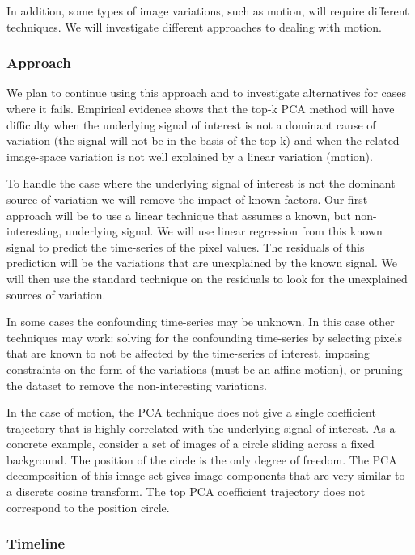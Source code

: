 In addition, some types of image variations, such as motion, will require
different techniques.  We will investigate different approaches to
dealing with motion. 

\subsubsection{Approach}


We plan to continue using this approach and to investigate
alternatives for cases where it fails.   Empirical evidence shows
that the top-k PCA method will have difficulty when the underlying
signal of interest is not a dominant cause of variation (the signal
will not be in the basis of the top-k) and when
the related image-space variation is not well explained by a linear
variation (\eg motion).

To handle the case where the underlying signal of interest is not the
dominant source of variation we will remove the impact of known
factors.  Our first approach will be to use a linear technique that
assumes a known, but non-interesting, underlying signal.  We will use
linear regression from this known signal to predict the time-series of
the pixel values.  The residuals of this prediction will be the
variations that are unexplained by the known signal.  We will then use
the standard technique on the residuals to look for the unexplained
sources of variation.

In some cases the confounding time-series may be unknown.  In this
case other techniques may work: solving for the confounding
time-series by selecting pixels that are known to not be affected by
the time-series of interest, imposing constraints on the form of the
variations (\eg must be an affine motion), or pruning the dataset to
remove the non-interesting variations.

In the case of motion, the PCA technique does not give a single
coefficient trajectory that is highly correlated with the underlying
signal of interest.  As a concrete example, consider a set of images
of a circle sliding across a fixed background.   The position of the
circle is the only degree of freedom.  The PCA decomposition of this
image set gives image components that are very similar to a discrete
cosine transform.  The top PCA coefficient trajectory does not
correspond to the position circle.

\subsubsection{Timeline}

